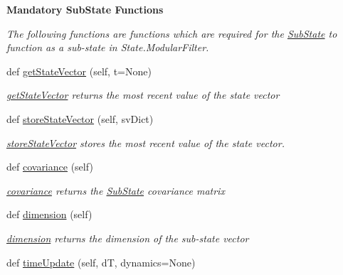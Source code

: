 \begin{Indent}{\bf Mandatory Sub\+State Functions}\par
{\em The following functions are functions which are required for the \hyperlink{classmodest_1_1substates_1_1substate_1_1SubState}{Sub\+State} to function as a sub-\/state in State.\+Modular\+Filter. }\begin{DoxyCompactItemize}
\item 
def \hyperlink{classmodest_1_1substates_1_1substate_1_1SubState_a1d8050de59c58969164f577899a55aa2}{get\+State\+Vector} (self, t=None)
\begin{DoxyCompactList}\small\item\em \hyperlink{classmodest_1_1substates_1_1substate_1_1SubState_a1d8050de59c58969164f577899a55aa2}{get\+State\+Vector} returns the most recent value of the state vector \end{DoxyCompactList}\item 
def \hyperlink{classmodest_1_1substates_1_1substate_1_1SubState_a3644149dc4cc19c0e32d0b7040998c96}{store\+State\+Vector} (self, sv\+Dict)
\begin{DoxyCompactList}\small\item\em \hyperlink{classmodest_1_1substates_1_1substate_1_1SubState_a3644149dc4cc19c0e32d0b7040998c96}{store\+State\+Vector} stores the most recent value of the state vector. \end{DoxyCompactList}\item 
def \hyperlink{classmodest_1_1substates_1_1substate_1_1SubState_a6e308aadd13962e476d2892ec728e3a5}{covariance} (self)
\begin{DoxyCompactList}\small\item\em \hyperlink{classmodest_1_1substates_1_1substate_1_1SubState_a6e308aadd13962e476d2892ec728e3a5}{covariance} returns the \hyperlink{classmodest_1_1substates_1_1substate_1_1SubState}{Sub\+State} covariance matrix \end{DoxyCompactList}\item 
def \hyperlink{classmodest_1_1substates_1_1substate_1_1SubState_ab9027f6d1d7d57c47731612f519b7ee6}{dimension} (self)
\begin{DoxyCompactList}\small\item\em \hyperlink{classmodest_1_1substates_1_1substate_1_1SubState_ab9027f6d1d7d57c47731612f519b7ee6}{dimension} returns the dimension of the sub-\/state vector \end{DoxyCompactList}\item 
def \hyperlink{classmodest_1_1substates_1_1substate_1_1SubState_a06d147fa5babe4e147b3267e67054ab4}{time\+Update} (self, dT, dynamics=None)

\end{DoxyCompactItemize}
\end{Indent}
